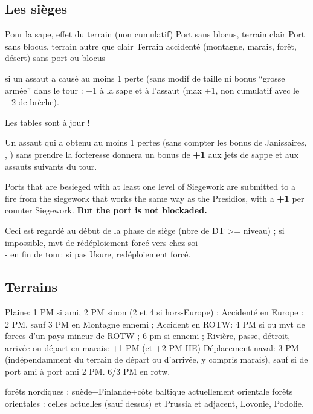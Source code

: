 \subsection{Les sièges}
\aparag Pour la sape, effet du terrain (non cumulatif)
      Port sans blocus, terrain clair
      Port sans blocus, terrain autre que clair
 Terrain accidenté (montagne, marais, forêt, désert) sans port
ou blocus

\aparag[TBD] si un assaut a causé au moins 1 perte (sans modif de
taille ni bonus ``grosse armée'' dans le tour : +1 à la sape et à
l'assaut (max +1, non cumulatif avec le +2 de brèche).


\aparag Les tables sont à jour !

\aparag[Expérimental]
Un assaut qui a obtenu au moins 1 pertes (sans compter les bonus
de Janissaires, \RUS, \POL) sans prendre la forteresse donnera un
bonus de {\bf +1} aux jets de sappe et aux assauts suivants du tour.

Ports that are besieged with at least one level of Siegework are
submitted to a fire from the siegework that works the same way as the
Presidios, with a {\bf +1} per counter Siegework\faceplus.  {\bf But the
 port is not blockaded.}

Ceci est regardé au début de la phase de siège (nbre de DT >= niveau) ;
si impossible, mvt de rédéploiement forcé vers chez soi \\
- en fin de tour: si pas Usure\faceplus, redéploiement forcé.


\subsection{Terrains}

\bparag Plaine: 1 PM si ami, 2 PM sinon (2 et 4 si hors-Europe) ;
\bparag Accidenté en Europe : 2 PM, sauf 3 PM en Montagne ennemi ;
\bparag Accident en ROTW: 4 PM si ou mvt de forces d'un pays mineur de
ROTW ; 6 pm si ennemi ;
\bparag Rivière, passe, détroit, arrivée ou départ en marais: +1 PM (et
+2 PM HE)
\bparag Déplacement naval: 3 PM (indépendamment du terrain de départ ou
d'arrivée, y compris marais), sauf si de port ami à port ami 2 PM. 6/3
PM en rotw.

\bparag  forêts nordiques : suède+Finlande+côte baltique actuellement orientale
\bparag forêts orientales : celles actuelles (sauf dessus) et Prussia et
adjacent, Lovonie, Podolie.


